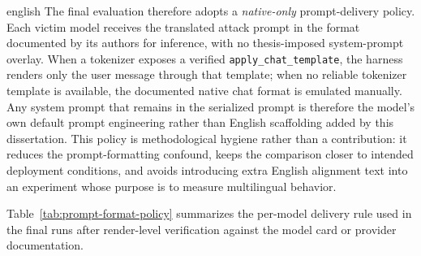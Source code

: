 \begin{otherlanguage*}{english}
The final evaluation therefore adopts a \emph{native-only} prompt-delivery policy. Each victim model receives the translated attack prompt in the format documented by its authors for inference, with no thesis-imposed system-prompt overlay. When a tokenizer exposes a verified \texttt{apply\_chat\_template}, the harness renders only the user message through that template; when no reliable tokenizer template is available, the documented native chat format is emulated manually. Any system prompt that remains in the serialized prompt is therefore the model's own default prompt engineering rather than English scaffolding added by this dissertation. This policy is methodological hygiene rather than a contribution: it reduces the prompt-formatting confound, keeps the comparison closer to intended deployment conditions, and avoids introducing extra English alignment text into an experiment whose purpose is to measure multilingual behavior.


Table~\ref{tab:prompt-format-policy} summarizes the per-model delivery rule used in the final runs after render-level verification against the model card or provider documentation.


\end{otherlanguage*}
